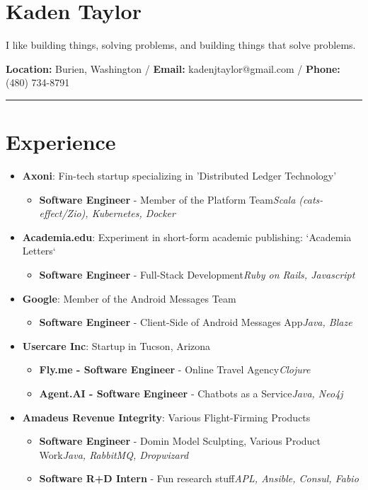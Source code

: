 \documentclass{article}
\begin{document}
\section*{Kaden Taylor}
I like building things, solving problems, and building things that solve problems.
\newline

\textbf{Location:} Burien, Washington /  \textbf{Email:} kadenjtaylor@gmail.com / \textbf{Phone:} (480) 734-8791

\noindent\rule{\linewidth}{1pt}

\section*{Experience}

\begin{itemize}\item \textbf{Axoni}: Fin-tech startup specializing in 'Distributed Ledger Technology' \begin{itemize}\item \textbf{Software Engineer} - Member of the Platform Team\newline \textit{Scala (cats-effect/Zio), Kubernetes, Docker}\end{itemize}
\item \textbf{Academia.edu}: Experiment in short-form academic publishing: `Academia Letters` \begin{itemize}\item \textbf{Software Engineer} - Full-Stack Development\newline \textit{Ruby on Rails, Javascript}\end{itemize}
\item \textbf{Google}: Member of the Android Messages Team \begin{itemize}\item \textbf{Software Engineer} - Client-Side of Android Messages App\newline \textit{Java, Blaze}\end{itemize}
\item \textbf{Usercare Inc}: Startup in Tucson, Arizona \begin{itemize}\item \textbf{Fly.me - Software Engineer} - Online Travel Agency\newline \textit{Clojure}
\item \textbf{Agent.AI - Software Engineer} - Chatbots as a Service\newline \textit{Java, Neo4j}\end{itemize}
\item \textbf{Amadeus Revenue Integrity}: Various Flight-Firming Products \begin{itemize}\item \textbf{Software Engineer} - Domin Model Sculpting, Various Product Work\newline \textit{Java, RabbitMQ, Dropwizard}
\item \textbf{Software R+D Intern} - Fun research stuff\newline \textit{APL, Ansible, Consul, Fabio}\end{itemize}\end{itemize}
\end{document}
